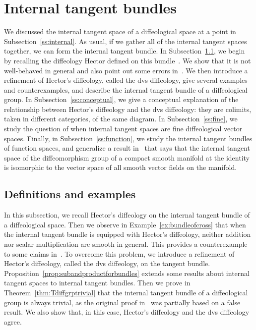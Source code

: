 \documentclass{amsart}
\theoremstyle{remark}
\begin{document}
\section{Internal tangent bundles}\label{s:bundle}

We discussed the internal tangent space of a diffeological space at a point in Subsection~\ref{ss:internal}.
As usual, if we gather all of the internal tangent spaces together, we can form the internal tangent bundle.
In Subsection~\ref{ss:dvs}, we begin by recalling the diffeology Hector defined on this bundle~\cite{He}.
We show that it is not well-behaved in general
and also point out some errors in~\cite{He,HM,La}.
We then introduce a refinement of Hector's diffeology, called the dvs diffeology,
give several examples and counterexamples, and describe the internal tangent bundle
of a diffeological group.
In Subsection~\ref{ss:conceptual}, we give a conceptual explanation of the
relationship between Hector's diffeology and the dvs diffeology:  they are
colimits, taken in different categories, of the same diagram.
In Subsection~\ref{ss:fine}, we study the question of when internal tangent spaces
are fine diffeological vector spaces.
Finally, in Subsection~\ref{ss:function}, we study the internal tangent bundles of function spaces,
and generalize a result in~\cite{He,HM} that says that the internal tangent space of
the diffeomorphism group of a compact smooth manifold at the identity is isomorphic
to the vector space of all smooth vector fields on the manifold.

\subsection{Definitions and examples}\label{ss:dvs}

In this subsection, we recall Hector's diffeology on the internal tangent bundle
of a diffeological space.  Then we observe in Example~\ref{ex:bundleofcross} that
when the internal tangent bundle is equipped with Hector's diffeology,
neither addition nor scalar multiplication are smooth in general.
This provides a counterexample to some claims in~\cite{He,HM,La}.
To overcome this problem, we introduce a refinement of Hector's diffeology,
called the dvs diffeology, on the tangent bundle.
Proposition~\ref{prop:subandproductforbundles} extends some results
about internal tangent spaces to internal tangent bundles.
Then we prove in Theorem~\ref{thm:Tdiffgrptrivial}
that the internal tangent bundle of a diffeological group is always trivial,
as the original proof in~\cite{HM} was partially based on a false result.
We also show that, in this case, Hector's diffeology and the dvs diffeology agree.
\end{document}
